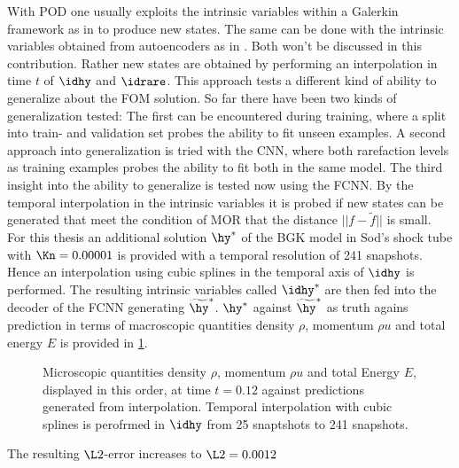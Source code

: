 With POD one usually exploits the intrinsic variables within a Galerkin framework as in \cite{Bernard} to produce new states. The same can be done with the intrinsic variables obtained from autoencoders as in \cite{Carlberg}. Both won't be discussed in this contribution. Rather new states are obtained by performing an interpolation in time \(t\) of \(\idhy\) and \(\idrare\). This approach tests a different kind of ability to generalize about the FOM solution. So far there have been two kinds of generalization tested: The first can be encountered during training, where a split into train- and validation set probes the ability to fit unseen examples. A second approach into generalization is tried with the CNN, where both rarefaction levels as training examples probes the ability to fit both in the same model. The third insight into the ability to generalize is tested now using the FCNN. By the temporal interpolation in the intrinsic variables it is probed if new states can be generated that meet the condition of MOR that the distance \(||f - \tilde{f}||\) is small.\\
For this thesis an additional solution \(\hy^*\) of the BGK model in Sod's shock tube with \(\Kn=0.00001\) is provided with a temporal resolution of 241 snapshots. Hence an interpolation using cubic splines in the temporal axis of \(\idhy\) is performed. The resulting intrinsic variables called \(\idhy^*\) are then fed into the decoder of the FCNN generating \(\widetilde{\hy}^*\). \(\hy^*\) against \(\widetilde{\hy}^*\) as truth agains prediction in terms of macroscopic quantities density \(\rho\), momentum \(\rho u\) and total energy \(E\) is provided in \cref{Fig: IntHy}.
\begin{figure}[H]
	
	\caption{Microscopic quantities density \(\rho\), momentum \(\rho u\) and total Energy \(E\), displayed in this order, at time \(t=0.12\) against predictions generated from interpolation. Temporal interpolation with cubic splines is perofrmed in \(\idhy\) from 25 snaptshots to 241 snapshots.}
	\label{Fig: IntHy}
\end{figure}
The resulting \(\L2\)-error increases to \(\L2=0.0012\) 
